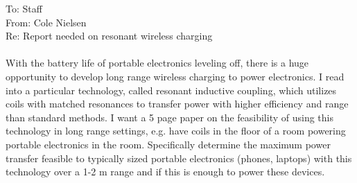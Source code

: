 \documentclass[12pt,a4paper]{report}
\begin{document}
	\noindent To: Staff\\
	From: Cole Nielsen\\
	Re: Report needed on resonant wireless charging\\
	\\
	With the battery life of portable electronics leveling off, there is a huge opportunity to develop long range wireless charging to power electronics. I read into a particular technology, called resonant inductive coupling, which utilizes coils with matched resonances to transfer power with higher efficiency and range than standard methods. I want a 5 page paper on the feasibility of using this technology in long range settings, e.g. have coils in the floor of a room powering portable electronics in the room. Specifically determine the maximum power transfer feasible to typically sized portable electronics (phones, laptops) with this technology over a 1-2 m range and if this is enough to power these devices.
\end{document}
